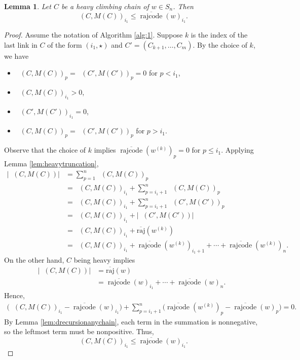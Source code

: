 \documentclass[11pt]{amsart}
\newtheorem{lemma}[theorem]{Lemma}
\theoremstyle{definition}
\theoremstyle{named}
\DeclareMathOperator{\rr}{\mathrm{rajcode}} %
\newcommand{\orr}{\overline{\rr}} %
\newcommand{\absoverrajcode}[1]{\overline{\mathrm{raj}}(#1)}
\DeclareMathOperator{\dwt}{\overline{\mathrm{wt}}}
\begin{document}
	\begin{lemma}
		\label{lem:heavymaxfirstmarks}
		Let $C$ be a heavy climbing chain of $w\in S_n$. Then
		\[\dwt(C,M(C))_{i_1}\leq \orr(w)_{i_1}. \]
	\end{lemma}
	\begin{proof}
		Assume the notation of Algorithm \ref{alg:1}. Suppose $k$ is the index of the last link in $C$ of the form $(i_1,\star)$ and $C'=(C_{k+1},\ldots,C_m)$.
		By the choice of $k$, we have
		\begin{itemize}
			\item $\dwt(C,M(C))_p=\dwt(C',M(C'))_p=0$ for $p<i_1$,
			\item $\dwt(C,M(C))_{i_1} >0$,
			\item $\dwt(C',M(C'))_{i_1} =0$,
			\item $\dwt(C,M(C))_p=\dwt(C',M(C'))_p$ for $p>i_1$.
		\end{itemize}
		Observe that the choice of $k$ implies $\orr(w^{(k)})_{p}=0$ for $p\leq i_1$. Applying Lemma \ref{lem:heavytruncation},
		\begin{align*}
			\left|\dwt(C,M(C))\right| &= \sum_{p=1}^{n}\dwt(C,M(C))_p \\
								 			 &= \dwt(C,M(C))_{i_1} + \sum_{p=i_1+1}^{n}\dwt(C,M(C))_{p} \\
								 			 &= \dwt(C,M(C))_{i_1} + \sum_{p=i_1+1}^{n}\dwt(C',M(C'))_{p} \\
								 			 &= \dwt(C,M(C))_{i_1} + \left|\dwt(C',M(C'))\right| \\
								 			 &= \dwt(C,M(C))_{i_1} +\absoverrajcode{w^{(k)}} \\
								 			 &= \dwt(C,M(C))_{i_1} +\orr(w^{(k)})_{i_1+1}+\cdots +\orr(w^{(k)})_n.
		\end{align*}
		On the other hand, $C$ being heavy implies
		\begin{align*}
			\left|\dwt(C,M(C))\right| &= \absoverrajcode{w}\\
											 &= \orr(w)_{i_1}+\cdots+\orr(w)_n.
		\end{align*}
		Hence,
		\begin{align}
			\label{eqn:1}
			\biggr(\dwt(C,M(C))_{i_1}-\orr(w)_{i_1}\biggr)+\sum_{p=i_1+1}^{n} \biggr(\orr(w^{(k)})_{p} -\orr(w)_{p}\biggr)=0.
		\end{align}
		By Lemma \ref{lem:drecursionanychain}, each term in the summation is nonnegative, so the leftmost term must be nonpositive. Thus,
		\[\dwt(C,M(C))_{i_1}\leq \orr(w)_{i_1}. \] 
	\end{proof}
		
\end{document}
